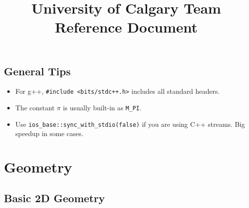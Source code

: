 \documentclass[letterpaper]{article}
\begin{document}
\title{University of Calgary Team Reference Document}
\maketitle
\thispagestyle{myheadings}

\begin{multicols*}{2}

    \tableofcontents

    \section{General Tips}
    \begin{itemize}
        \item For g++, \texttt{\#include <bits/stdc++.h>} includes all standard headers.
        \item The constant $\pi$ is usually built-in as \texttt{M\_PI}.
        \item Use \texttt{ios\_base::sync\_with\_stdio(false)} if you are using C++ streams. Big speedup in some cases.
    \end{itemize}

\end{multicols*}

\section{Geometry}

\subsection{Basic 2D Geometry}
\end{document}
